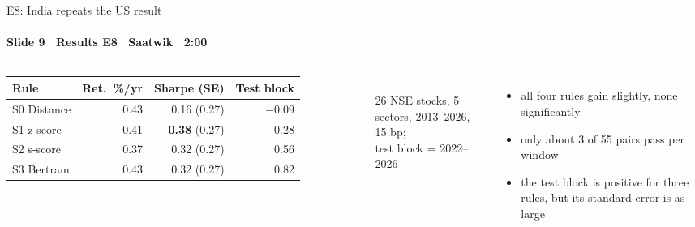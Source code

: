 \begin{frame}{E8: India repeats the US result}
\framesubtitle{Slide 9 \textbullet\ Results E8 \textbullet\ Saatwik \textbullet\ 2:00}
\vspace{-2pt}
\begin{columns}[T,onlytextwidth]
  \footnotesize\setlength{\tabcolsep}{4pt}
  \begin{tabular}{@{}lrrr@{}}
    \toprule
    Rule & Ret.\ \%/yr & Sharpe (SE) & Test block \\
    \midrule
    S0 Distance & 0.43 & 0.16 (0.27) & $-0.09$ \\
    S1 z-score  & 0.41 & \textbf{0.38} (0.27) & 0.28 \\
    S2 s-score  & 0.37 & 0.32 (0.27) & 0.56 \\
    S3 Bertram  & 0.43 & 0.32 (0.27) & 0.82 \\
    \bottomrule
  \end{tabular}\\[3pt]
  {\scriptsize 26 NSE stocks, 5 sectors, 2013--2026, 15 bp;\\ test block = 2022--2026}
  \small\raggedright
  \begin{itemize}\setlength{\itemsep}{4pt}
    \item all four rules gain slightly, none significantly
    \item only about 3 of 55 pairs pass per window
    \item the test block is positive for three rules, but its standard error is as large
  \end{itemize}
\end{columns}
\end{frame}
